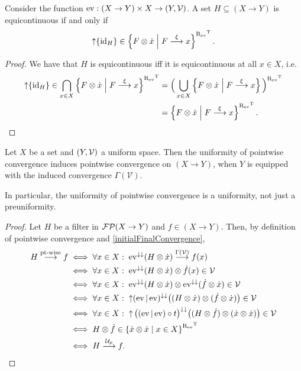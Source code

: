 \begin{lemma}
Consider the function $\operatorname{ev}: (X\to Y)\times X \to \left( Y,\mathcal{V} \right)$.
A set $H\subseteq (X\to Y)$ is equicontinuous \textup{if and only if}
\[ \operatorname{\uparrow}\{\operatorname{id}_H\} \in \left\{ F\otimes \dot{x} \;\middle|\; F\overset{\xi}{\longrightarrow}x \right\}^{\mathrel{\mathrm{R}_{\operatorname{ev}}}^{\mathrm{T}}}. \]
\end{lemma}
\begin{proof}
We have that $H$ is equicontinuous iff it is equicontinuous at all $x\in X$, i.e.\
\begin{align*}
\operatorname{\uparrow}\{\operatorname{id}_H\}\in \bigcap_{x\in X}\left\{ F\otimes \dot{x} \;\middle|\; F\overset{\xi}{\longrightarrow}x \right\}^{\mathrel{\mathrm{R}_{\operatorname{ev}}}^{\mathrm{T}}} &= \Big(\bigcup_{x\in X}\left\{ F\otimes \dot{x} \;\middle|\; F\overset{\xi}{\longrightarrow}x \right\}\Big)^{\mathrel{\mathrm{R}_{\operatorname{ev}}}^{\mathrm{T}}} \\
&= \left\{ F\otimes \dot{x} \;\middle|\; F\overset{\xi}{\longrightarrow}x \right\}^{\mathrel{\mathrm{R}_{\operatorname{ev}}}^{\mathrm{T}}}.
\end{align*}
\end{proof}


\begin{lemma}
Let $X$ be a set and $\left( Y, \mathcal{V} \right)$ a uniform space. Then the uniformity of pointwise convergence induces pointwise convergence on $(X\to Y)$, when $Y$ is equipped with the induced convergence $\Gamma(\mathcal{V})$.
\end{lemma}
In particular, the uniformity of pointwise convergence is a uniformity, not just a preuniformity.
\begin{proof}
Let $H$ be a filter in $\operatorname{\mathcal{FP}}(X\to Y)$ and $f\in (X\to Y)$. Then, by definition of pointwise convergence and \ref{initialFinalConvergence},
\begin{align*}
H\overset{\text{pt-wise}}{\longrightarrow} f &\iff \forall x\in X: \; \operatorname{ev}^{\downarrow\downarrow}(H\otimes\dot{x}) \overset{\Gamma(\mathcal{V})}{\longrightarrow} f(x) \\
&\iff \forall x\in X: \; \operatorname{ev}^{\downarrow\downarrow}(H\otimes\dot{x}) \otimes \dot{f}(x) \in\mathcal{V} \\
&\iff \forall x\in X: \; \operatorname{ev}^{\downarrow\downarrow}(H\otimes\dot{x}) \otimes \operatorname{ev}^{\downarrow\downarrow}(\dot{f}\otimes \dot{x}) \in\mathcal{V} \\
&\iff \forall x\in X: \; \operatorname{\uparrow}(\operatorname{ev}|\operatorname{ev})^{\downarrow\downarrow}\big((H\otimes \dot{x}) \otimes (\dot{f}\otimes \dot{x})\big) \in\mathcal{V} \\
&\iff \forall x\in X: \; \operatorname{\uparrow}\big((\operatorname{ev}|\operatorname{ev})\circ t\big)^{\downarrow\downarrow}\big((H\otimes \dot{f}) \otimes (\dot{x}\otimes \dot{x})\big) \in\mathcal{V} \\
&\iff H\otimes \dot{f} \in \left\{ \dot{x}\otimes\dot{x} \;\middle|\; x\in X \right\}^{\mathrel{\mathrm{R}_{\operatorname{ev}}}^{\mathrm{T}}} \\
&\iff H \overset{\mathcal{U}_p}{\longrightarrow} f.
\end{align*}
\end{proof}

